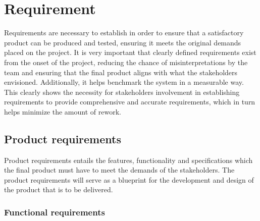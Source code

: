 \section{Requirement}
\label{section:requirement}

Requirements are necessary to establish in order to ensure that a satisfactory product can be produced and tested, ensuring it meets the original demands placed on the project. It is very important that clearly defined requirements exist from the onset of the project, reducing the chance of misinterpretations by the team and ensuring that the final product aligns with what the stakeholders envisioned. Additionally, it helps benchmark the system in a measurable way. This clearly shows the necessity for stakeholders involvement in establishing requirements to provide comprehensive and accurate requirements, which in turn helps minimize the amount of rework.

\subsection{Product requirements}
\label{subsection:product_requirements}

Product requirements entails the features, functionality and specifications which the final product must have to meet the demands of the stakeholders. The product requirements will serve as a blueprint for the development and design of the product that is to be delivered.



\subsubsection{Functional requirements}

